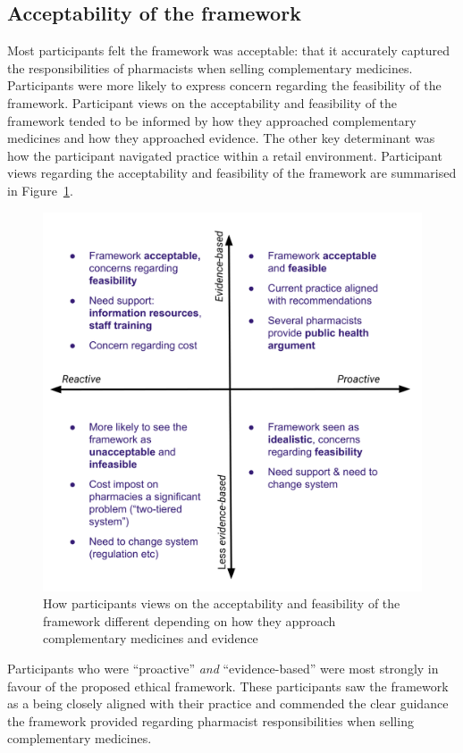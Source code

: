 \documentclass[11pt,a4paper]{article}
\begin{document}
\subsection{Acceptability of the framework}\label{acceptability}

Most participants felt the framework was acceptable: that it accurately
captured the responsibilities of pharmacists when selling complementary
medicines. Participants were more likely to express concern regarding
the feasibility of the framework. Participant views on the acceptability
and feasibility of the framework tended to be informed by how they
approached complementary medicines and how they approached evidence. The
other key determinant was how the participant navigated practice within
a retail environment. Participant views regarding the acceptability and
feasibility of the framework are summarised in Figure~\ref{accfeas}.

\begin{figure}
\centering
\includegraphics{files/CMEthics_accfeas.png}
\caption{How participants views on the acceptability and feasibility of
the framework different depending on how they approach complementary
medicines and evidence \label{accfeas}}
\end{figure}

Participants who were ``proactive'' \emph{and} ``evidence-based'' were
most strongly in favour of the proposed ethical framework. These
participants saw the framework as a being closely aligned with their
practice and commended the clear guidance the framework provided
regarding pharmacist responsibilities when selling complementary
medicines.
\end{document}
